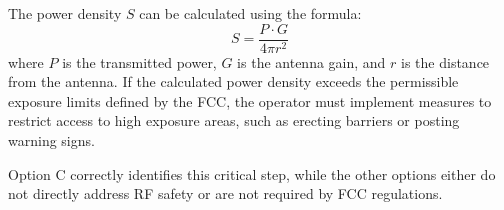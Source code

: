 The power density \( S \) can be calculated using the formula:
\[
S = \frac{P \cdot G}{4 \pi r^2}
\]
where \( P \) is the transmitted power, \( G \) is the antenna gain, and \( r \) is the distance from the antenna. If the calculated power density exceeds the permissible exposure limits defined by the FCC, the operator must implement measures to restrict access to high exposure areas, such as erecting barriers or posting warning signs. 

Option C correctly identifies this critical step, while the other options either do not directly address RF safety or are not required by FCC regulations.

